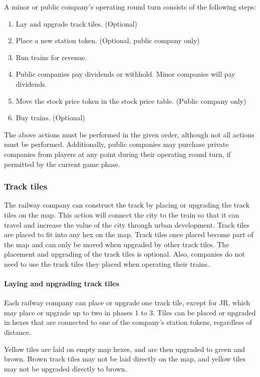 \documentclass{article}
\begin{document}
\begin{CJK}{UTF8}{min}
\begin{multicols}{2}
A minor or public company's operating round turn consists of the following steps:

\begin{enumerate}
\item Lay and upgrade track tiles. (Optional)
\item Place a new station token. (Optional, public company only)
\item Run trains for revenue.
\item Public companies pay dividends or withhold. Minor companies will
  pay dividends.
\item Move the stock price token in the stock price table. (Public company only)
\item Buy trains. (Optional)
\end{enumerate}

The above actions must be performed in the given order, although not
all actions must be performed. Additionally, public companies may
purchase private companies from players at any point during their
operating round turn, if permitted by the current game phase.

\subsubsection{Track tiles}
The railway company can construct the track by placing or upgrading
the track tiles on the map. This action will connect the city to the
train so that it can travel and increase the value of the city through
urban development. Track tiles are placed to fit into any hex on the
map. Track tiles once placed become part of the map and can only be
moved when upgraded by other track tiles. The placement and upgrading
of the track tiles is optional. Also, companies do not need to use the
track tiles they placed when operating their trains.

\paragraph{Laying and upgrading track tiles} \label{or-laying-tiles}
Each railway company can place or upgrade one track tile, except for
JR, which may place or upgrade up to two in phases 1 to 3. Tiles can
be placed or upgraded in hexes that are connected to one of the
company's station tokens, regardless of distance.

Yellow tiles are laid on empty map hexes, and are then upgraded to
green and brown. Brown track tiles may not be laid directly on the
map, and yellow tiles may not be upgraded directly to brown.


\end{multicols}
\end{CJK}
\end{document}
